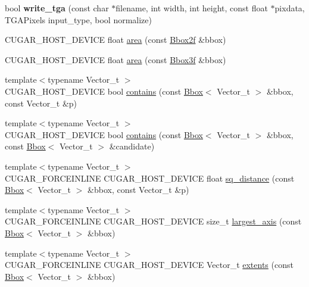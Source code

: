 \begin{DoxyCompactItemize}
\item 
\mbox{\label{namespacecugar_ad13f0185bf2194be32df6eb4d1c686e2}} 
bool {\bfseries write\+\_\+tga} (const char $\ast$filename, int width, int height, const float $\ast$pixdata, T\+G\+A\+Pixels input\+\_\+type, bool normalize)
\item 
C\+U\+G\+A\+R\+\_\+\+H\+O\+S\+T\+\_\+\+D\+E\+V\+I\+CE float \hyperlink{group___bbox_module_ga9bac92087484f436dd7eb6f20cb0b15a}{area} (const \hyperlink{structcugar_1_1_bbox}{Bbox2f} \&bbox)
\item 
C\+U\+G\+A\+R\+\_\+\+H\+O\+S\+T\+\_\+\+D\+E\+V\+I\+CE float \hyperlink{group___bbox_module_gae06f9ebe0da53f175c2d35b0ef604b1a}{area} (const \hyperlink{structcugar_1_1_bbox}{Bbox3f} \&bbox)
\item 
{\footnotesize template$<$typename Vector\+\_\+t $>$ }\\C\+U\+G\+A\+R\+\_\+\+H\+O\+S\+T\+\_\+\+D\+E\+V\+I\+CE bool \hyperlink{group___bbox_module_ga997d14f97dd4c3c80e1896796170ea60}{contains} (const \hyperlink{structcugar_1_1_bbox}{Bbox}$<$ Vector\+\_\+t $>$ \&bbox, const Vector\+\_\+t \&p)
\item 
{\footnotesize template$<$typename Vector\+\_\+t $>$ }\\C\+U\+G\+A\+R\+\_\+\+H\+O\+S\+T\+\_\+\+D\+E\+V\+I\+CE bool \hyperlink{group___bbox_module_gaeb563052dce95e32012796563ea7f611}{contains} (const \hyperlink{structcugar_1_1_bbox}{Bbox}$<$ Vector\+\_\+t $>$ \&bbox, const \hyperlink{structcugar_1_1_bbox}{Bbox}$<$ Vector\+\_\+t $>$ \&candidate)
\item 
{\footnotesize template$<$typename Vector\+\_\+t $>$ }\\C\+U\+G\+A\+R\+\_\+\+F\+O\+R\+C\+E\+I\+N\+L\+I\+NE C\+U\+G\+A\+R\+\_\+\+H\+O\+S\+T\+\_\+\+D\+E\+V\+I\+CE float \hyperlink{group___bbox_module_ga771255b0f67e5f421e1cbb5b2fa367e0}{sq\+\_\+distance} (const \hyperlink{structcugar_1_1_bbox}{Bbox}$<$ Vector\+\_\+t $>$ \&bbox, const Vector\+\_\+t \&p)
\item 
{\footnotesize template$<$typename Vector\+\_\+t $>$ }\\C\+U\+G\+A\+R\+\_\+\+F\+O\+R\+C\+E\+I\+N\+L\+I\+NE C\+U\+G\+A\+R\+\_\+\+H\+O\+S\+T\+\_\+\+D\+E\+V\+I\+CE size\+\_\+t \hyperlink{group___bbox_module_ga45c74efdebfc6b9233fecb19aa268e45}{largest\+\_\+axis} (const \hyperlink{structcugar_1_1_bbox}{Bbox}$<$ Vector\+\_\+t $>$ \&bbox)
\item 
{\footnotesize template$<$typename Vector\+\_\+t $>$ }\\C\+U\+G\+A\+R\+\_\+\+F\+O\+R\+C\+E\+I\+N\+L\+I\+NE C\+U\+G\+A\+R\+\_\+\+H\+O\+S\+T\+\_\+\+D\+E\+V\+I\+CE Vector\+\_\+t \hyperlink{group___bbox_module_ga4f5184c6a804324810a86f4e6ccd29f4}{extents} (const \hyperlink{structcugar_1_1_bbox}{Bbox}$<$ Vector\+\_\+t $>$ \&bbox)

\end{DoxyCompactItemize}

